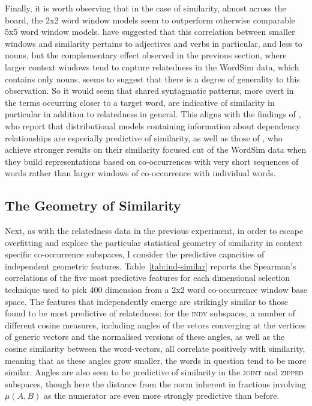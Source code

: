 Finally, it is worth observing that in the case of similarity, almost across the board, the 2x2 word window models seem to outperform otherwise comparable 5x5 word window models.  \cite{HillEA2015} have suggested that this correlation between smaller windows and similarity pertains to adjectives and verbs in particular, and less to nouns, but the complementary effect observed in the previous section, where larger context windows tend to capture relatedness in the WordSim data, which contains only nouns, seems to suggest that there is a degree of generality to this observation.  So it would seem that shared syntagmatic patterns, more overt in the terms occurring closer to a target word, are indicative of similarity in particular in addition to relatedness in general.  This aligns with the findings of \cite{KielaEA2014}, who report that distributional models containing information about dependency relationships are especially predictive of similarity, as well as those of \cite{AgirreEA2009}, who achieve stronger results on their similarity focused cut of the WordSim data when they build representations based on co-occurrences with very short sequences of words rather than larger windows of co-occurrence with individual words.

\subsection{The Geometry of Similarity}
Next, as with the relatedness data in the previous experiment, in order to escape overfitting and explore the particular statistical geometry of similarity in context specific co-occurrence subspaces, I consider the predictive capacities of independent geometric features.  Table~\ref{tab:ind-similar} reports the Spearman's correlations of the five most predictive features for each dimensional selection technique used to pick 400 dimension from a 2x2 word co-occurrence window base space.  The features that independently emerge are strikingly similar to those found to be most predictive of relatedness: for the \textsc{indy} subspaces, a number of different cosine measures, including angles of the vetors converging at the vertices of generic vectors and the normalised versions of these angles, as well as the cosine similarity between the word-vectors, all correlate positively with similarity, meaning that as these angles grow smaller, the words in question tend to be more similar.  Angles are also seen to be predictive of similarity in the \textsc{joint} and \textsc{zipped} subspaces, though here the distance from the norm inherent in fractions involving $\mu(A,B)$ as the numerator are even more strongly predictive than before.

